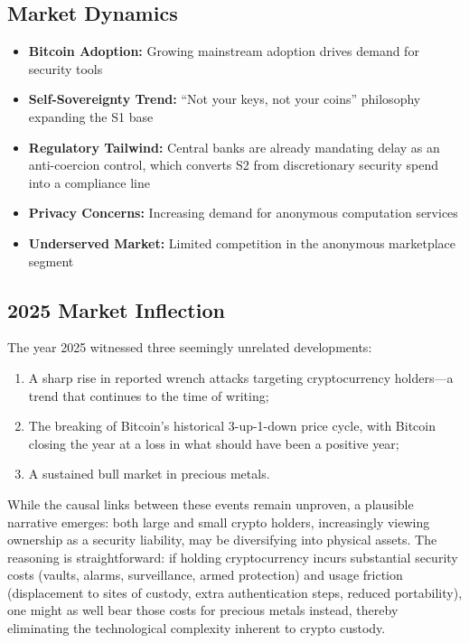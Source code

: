 \subsection{Market Dynamics}
\begin{itemize}[nosep]
  \item \textbf{Bitcoin Adoption:} Growing mainstream adoption drives demand for
    security tools
  \item \textbf{Self-Sovereignty Trend:} ``Not your keys, not your coins'' philosophy
    expanding the S1 base
  \item \textbf{Regulatory Tailwind:} Central banks are already mandating delay as an
    anti-coercion control\cite{bcb2021res142}, which converts S2 from discretionary
    security spend into a compliance line
  \item \textbf{Privacy Concerns:} Increasing demand for anonymous computation
    services
  \item \textbf{Underserved Market:} Limited competition in the anonymous marketplace
    segment
\end{itemize}

\subsection{2025 Market Inflection}
\label{sec:market-inflection}
The year 2025 witnessed three seemingly unrelated developments:
\begin{enumerate}
  \item A sharp rise in reported wrench attacks targeting cryptocurrency holders\cite{lopp2024,trmlabs2025,theblock2025,chainalysis2025}---a trend that continues to the time of writing;
  \item The breaking of Bitcoin's historical 3-up-1-down price cycle, with Bitcoin closing the year at a loss in what should have been a positive year\cite{cnbc2025btc,ccn2025btc};
  \item A sustained bull market in precious metals\cite{bloomberg2025gold,jpmorgan2025gold}.
\end{enumerate}

While the causal links between these events remain unproven, a plausible narrative emerges: both large and small crypto holders, increasingly viewing ownership as a security liability, may be diversifying into physical assets. The reasoning is straightforward: if holding cryptocurrency incurs substantial security costs (vaults, alarms, surveillance, armed protection) and usage friction (displacement to sites of custody, extra authentication steps, reduced portability), one might as well bear those costs for precious metals instead, thereby eliminating the technological complexity inherent to crypto custody.

